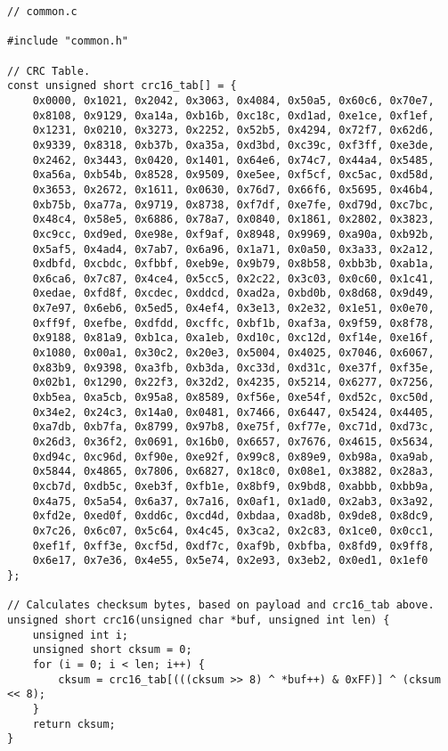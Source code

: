 \begin{lstlisting}
// common.c

#include "common.h"

// CRC Table.
const unsigned short crc16_tab[] = {
    0x0000, 0x1021, 0x2042, 0x3063, 0x4084, 0x50a5, 0x60c6, 0x70e7,
    0x8108, 0x9129, 0xa14a, 0xb16b, 0xc18c, 0xd1ad, 0xe1ce, 0xf1ef,
    0x1231, 0x0210, 0x3273, 0x2252, 0x52b5, 0x4294, 0x72f7, 0x62d6,
    0x9339, 0x8318, 0xb37b, 0xa35a, 0xd3bd, 0xc39c, 0xf3ff, 0xe3de,
    0x2462, 0x3443, 0x0420, 0x1401, 0x64e6, 0x74c7, 0x44a4, 0x5485,
    0xa56a, 0xb54b, 0x8528, 0x9509, 0xe5ee, 0xf5cf, 0xc5ac, 0xd58d,
    0x3653, 0x2672, 0x1611, 0x0630, 0x76d7, 0x66f6, 0x5695, 0x46b4,
    0xb75b, 0xa77a, 0x9719, 0x8738, 0xf7df, 0xe7fe, 0xd79d, 0xc7bc,
    0x48c4, 0x58e5, 0x6886, 0x78a7, 0x0840, 0x1861, 0x2802, 0x3823,
    0xc9cc, 0xd9ed, 0xe98e, 0xf9af, 0x8948, 0x9969, 0xa90a, 0xb92b,
    0x5af5, 0x4ad4, 0x7ab7, 0x6a96, 0x1a71, 0x0a50, 0x3a33, 0x2a12,
    0xdbfd, 0xcbdc, 0xfbbf, 0xeb9e, 0x9b79, 0x8b58, 0xbb3b, 0xab1a, 
    0x6ca6, 0x7c87, 0x4ce4, 0x5cc5, 0x2c22, 0x3c03, 0x0c60, 0x1c41,
    0xedae, 0xfd8f, 0xcdec, 0xddcd, 0xad2a, 0xbd0b, 0x8d68, 0x9d49,
    0x7e97, 0x6eb6, 0x5ed5, 0x4ef4, 0x3e13, 0x2e32, 0x1e51, 0x0e70,
    0xff9f, 0xefbe, 0xdfdd, 0xcffc, 0xbf1b, 0xaf3a, 0x9f59, 0x8f78,
    0x9188, 0x81a9, 0xb1ca, 0xa1eb, 0xd10c, 0xc12d, 0xf14e, 0xe16f,
    0x1080, 0x00a1, 0x30c2, 0x20e3, 0x5004, 0x4025, 0x7046, 0x6067,
    0x83b9, 0x9398, 0xa3fb, 0xb3da, 0xc33d, 0xd31c, 0xe37f, 0xf35e,
    0x02b1, 0x1290, 0x22f3, 0x32d2, 0x4235, 0x5214, 0x6277, 0x7256,
    0xb5ea, 0xa5cb, 0x95a8, 0x8589, 0xf56e, 0xe54f, 0xd52c, 0xc50d,
    0x34e2, 0x24c3, 0x14a0, 0x0481, 0x7466, 0x6447, 0x5424, 0x4405,
    0xa7db, 0xb7fa, 0x8799, 0x97b8, 0xe75f, 0xf77e, 0xc71d, 0xd73c,
    0x26d3, 0x36f2, 0x0691, 0x16b0, 0x6657, 0x7676, 0x4615, 0x5634,
    0xd94c, 0xc96d, 0xf90e, 0xe92f, 0x99c8, 0x89e9, 0xb98a, 0xa9ab,
    0x5844, 0x4865, 0x7806, 0x6827, 0x18c0, 0x08e1, 0x3882, 0x28a3,
    0xcb7d, 0xdb5c, 0xeb3f, 0xfb1e, 0x8bf9, 0x9bd8, 0xabbb, 0xbb9a,
    0x4a75, 0x5a54, 0x6a37, 0x7a16, 0x0af1, 0x1ad0, 0x2ab3, 0x3a92,
    0xfd2e, 0xed0f, 0xdd6c, 0xcd4d, 0xbdaa, 0xad8b, 0x9de8, 0x8dc9,
    0x7c26, 0x6c07, 0x5c64, 0x4c45, 0x3ca2, 0x2c83, 0x1ce0, 0x0cc1,
    0xef1f, 0xff3e, 0xcf5d, 0xdf7c, 0xaf9b, 0xbfba, 0x8fd9, 0x9ff8,
    0x6e17, 0x7e36, 0x4e55, 0x5e74, 0x2e93, 0x3eb2, 0x0ed1, 0x1ef0
};

// Calculates checksum bytes, based on payload and crc16_tab above.
unsigned short crc16(unsigned char *buf, unsigned int len) {
    unsigned int i;
    unsigned short cksum = 0;
    for (i = 0; i < len; i++) {
        cksum = crc16_tab[(((cksum >> 8) ^ *buf++) & 0xFF)] ^ (cksum << 8);
    }
    return cksum;
}
\end{lstlisting}

